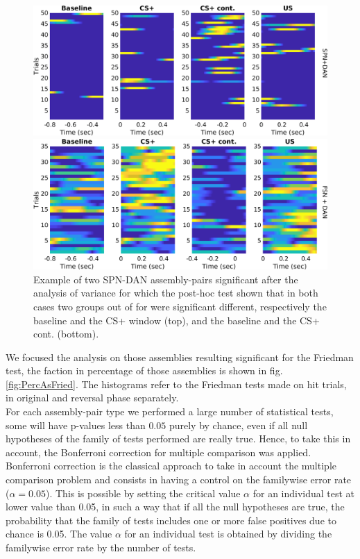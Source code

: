\begin{figure}
    \centering
    \includegraphics[scale=0.4]{figures/SPN_DANexPreRew.png}
    
   \vspace{1cm}
   
   \includegraphics[scale=0.4]{figures/FSN_DANexStimRew.png}
    \caption{Example of two SPN-DAN assembly-pairs significant after the analysis of variance for which the post-hoc test shown that in both cases two groups out of for were significant different, respectively the baseline and the CS+ window (top), and the baseline and the CS+ cont. (bottom).}
    \label{fig:SPN_Ex}
\end{figure}
We focused the analysis on those assemblies resulting significant for the Friedman test, the faction in percentage of those assemblies is shown in fig.\ref{fig:PercAsFried}. The histograms refer to the Friedman tests made on hit trials, in original and reversal phase separately.\\For each assembly-pair type we performed a large number of statistical tests, some will have p-values less than $0.05$ purely by chance, even if all null hypotheses of the family of tests performed are really true. Hence, to take this in account, the Bonferroni correction for multiple comparison was applied. Bonferroni correction is the classical approach to take in account the multiple comparison problem and consists in having a control on the familywise error rate ($\alpha=0.05$). This is possible by setting the critical value $\alpha$ for an individual test at lower value than 0.05, in such a way that if all the null hypotheses are true, the probability that the family of tests includes one or more false positives due to chance is 0.05. The value $\alpha$ for an individual test is obtained by dividing the familywise error rate by the number of tests.\\
